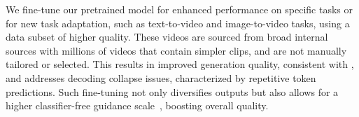 We fine-tune our pretrained model for enhanced performance on specific tasks or for new task adaptation, such as text-to-video and image-to-video tasks, using a data subset of higher quality. These videos are sourced from broad internal sources with millions of videos that contain simpler clips, and are not manually tailored or selected. This results in improved generation quality, consistent with \citet{zhou2023lima}, and addresses decoding collapse issues, characterized by repetitive token predictions. 
%
Such fine-tuning not only diversifies outputs but also allows for a higher classifier-free guidance scale~\cite{ho2022classifier}, boosting overall quality. 
